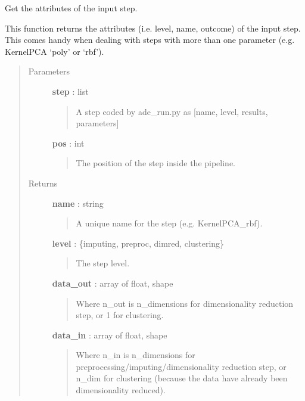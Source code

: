\documentclass[letterpaper,10pt,english]{sphinxmanual}
\begin{document}

\begin{fulllineitems}
\label{index:adenine.core.analyze_results.get_step_attributes}
Get the attributes of the input step.

This function returns the attributes (i.e. level, name, outcome) of the input step. This comes handy when dealing with steps with more than one parameter (e.g. KernelPCA `poly' or `rbf').
\begin{quote}\begin{description}
\item[{Parameters}] \leavevmode
\textbf{step} : list
\begin{quote}

A step coded by ade\_run.py as {[}name, level, results, parameters{]}
\end{quote}

\textbf{pos} : int
\begin{quote}

The position of the step inside the pipeline.
\end{quote}

\item[{Returns}] \leavevmode
\textbf{name} : string
\begin{quote}

A unique name for the step (e.g. KernelPCA\_rbf).
\end{quote}

\textbf{level} : \{imputing, preproc, dimred, clustering\}
\begin{quote}

The step level.
\end{quote}

\textbf{data\_out} : array of float, shape
\begin{quote}

Where n\_out is n\_dimensions for dimensionality reduction step, or 1 for clustering.
\end{quote}

\textbf{data\_in} : array of float, shape
\begin{quote}

Where n\_in is n\_dimensions for preprocessing/imputing/dimensionality reduction step, or n\_dim for clustering (because the data have already been dimensionality reduced).
\end{quote}


\end{description}
\end{quote}
\end{fulllineitems}
\end{document}
